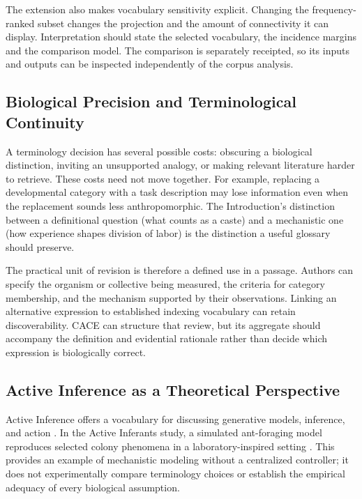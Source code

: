 \documentclass[
]{article}
\numberwithin{equation}{section}
\begin{document}
The extension also makes vocabulary sensitivity explicit. Changing the
frequency-ranked subset changes the projection and the amount of
connectivity it can display. Interpretation should state the selected
vocabulary, the incidence margins and the comparison model. The
comparison is separately receipted, so its inputs and outputs can be
inspected independently of the corpus analysis.

\subsection{Biological Precision and Terminological
Continuity}\label{biological-precision-and-terminological-continuity}

A terminology decision has several possible costs: obscuring a
biological distinction, inviting an unsupported analogy, or making
relevant literature harder to retrieve. These costs need not move
together. For example, replacing a developmental category with a task
description may lose information even when the replacement sounds less
anthropomorphic. The Introduction's distinction between a definitional
question (what counts as a caste) and a mechanistic one (how experience
shapes division of labor) is the distinction a useful glossary should
preserve.

The practical unit of revision is therefore a defined use in a passage.
Authors can specify the organism or collective being measured, the
criteria for category membership, and the mechanism supported by their
observations. Linking an alternative expression to established indexing
vocabulary can retain discoverability. CACE can structure that review,
but its aggregate should accompany the definition and evidential
rationale rather than decide which expression is biologically correct.

\subsection{Active Inference as a Theoretical
Perspective}\label{active-inference-as-a-theoretical-perspective}

Active Inference offers a vocabulary for discussing generative models,
inference, and action \citep{friston2010free, clark2013whatever}. In the
Active Inferants study, a simulated ant-foraging model reproduces
selected colony phenomena in a laboratory-inspired setting
\citep{friedman2021active}. This provides an example of mechanistic
modeling without a centralized controller; it does not experimentally
compare terminology choices or establish the empirical adequacy of every
biological assumption.
\end{document}
